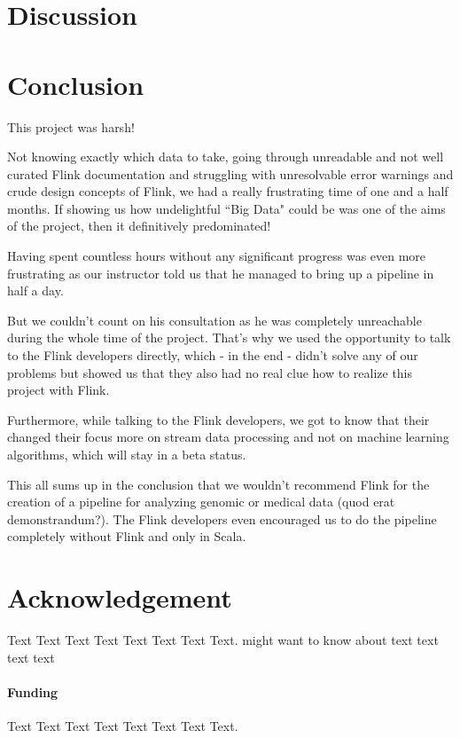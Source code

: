 \documentclass{bioinfo}
\begin{document}
\section{Discussion}






\section{Conclusion}


This project was harsh!

Not knowing exactly which data to take, going through unreadable and not well curated Flink documentation and struggling with unresolvable error warnings and crude design concepts of Flink, we had a really frustrating time of one and a half months.
If showing us how undelightful ``Big Data" could be was one of the aims of the project, then it definitively predominated!

Having spent countless hours without any significant progress was even more frustrating as our instructor told us that he managed to bring up a pipeline in half a day.

But we couldn't count on his consultation as he was completely unreachable during the whole time of the project. That's why we used the opportunity to talk to the Flink developers directly, which - in the end - didn't solve any of our problems but showed us that they also had no real clue how to realize this project with Flink.

Furthermore, while talking to the Flink developers, we got to know that their changed their focus more on stream data processing and not on machine learning algorithms, which will stay in a beta status.

This all sums up in the conclusion that we wouldn't recommend Flink for the creation of a pipeline for analyzing genomic or medical data (quod erat demonstrandum?). The Flink developers even encouraged us to do the pipeline completely without Flink and only in Scala.



\section*{Acknowledgement}
Text Text Text Text Text Text  Text Text.  \citealp{Boffelli03} might want to know about  text text text text

\paragraph{Funding\textcolon} Text Text Text Text Text Text  Text Text.
\end{document}
